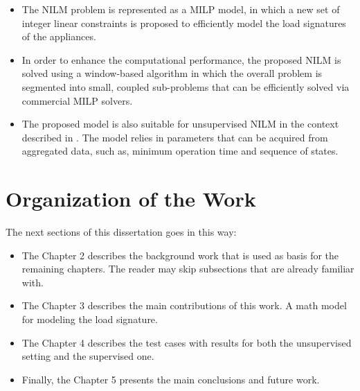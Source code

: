 \begin{itemize}
\item The NILM problem is represented as a MILP model, in which a new set of integer linear constraints is proposed to efficiently model the load signatures of the appliances.
\item In order to enhance the computational performance, the proposed NILM is solved using a window-based algorithm in which the overall problem is segmented into small, coupled sub-problems that can be efficiently solved via commercial MILP solvers.
\item The proposed model is also suitable for unsupervised NILM in the context described in \cite{makonin2016}. The model relies in parameters that can be acquired from aggregated data, such as, minimum operation time and sequence of states.
\end{itemize}

\section{Organization of the Work}

The next sections of this dissertation goes in this way:
\begin{itemize}
\item The Chapter 2 describes the background work that is used as basis for the remaining chapters. The reader may skip subsections that are already familiar with. 
\item The Chapter 3 describes the main contributions of this work. A math model for modeling the load signature. 
\item The Chapter 4 describes the test cases with results for both the unsupervised setting and the supervised one. 
\item Finally, the Chapter 5 presents the main conclusions and future work. 
\end{itemize}